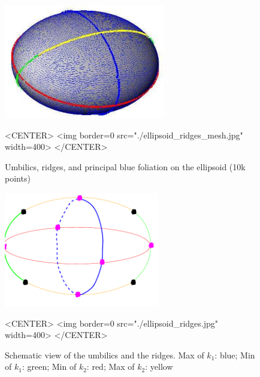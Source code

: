 
\begin{figure}[!ht] 
\begin{ccTexOnly}
\centerline{ 
\includegraphics[height=5cm]{Ridges_3/ellipsoid_ridges_mesh}}
\end{ccTexOnly}

\begin{ccHtmlOnly}
<CENTER> <img border=0 src="./ellipsoid_ridges_mesh.jpg" width=400>
</CENTER>
\end{ccHtmlOnly}

\caption{Umbilics, ridges, and principal blue foliation on the
ellipsoid (10k points)}
\label{pict:ellipsoid_ridges} 
\end{figure} 
\hfill
\begin{figure}[H] 
\begin{ccTexOnly}
\centerline{ 
\includegraphics[height=5cm]{Ridges_3/ellipsoid_ridges}}
\end{ccTexOnly}

\begin{ccHtmlOnly}
<CENTER> <img border=0 src="./ellipsoid_ridges.jpg" width=400>
</CENTER>
\end{ccHtmlOnly}

\caption{Schematic view of the umbilics and the ridges. Max of $k_1$:
blue; Min of $k_1$: green; Min of $k_2$: red; Max of $k_2$: yellow}
\label{fig:ridges_ellipsoid}
\end{figure} 



